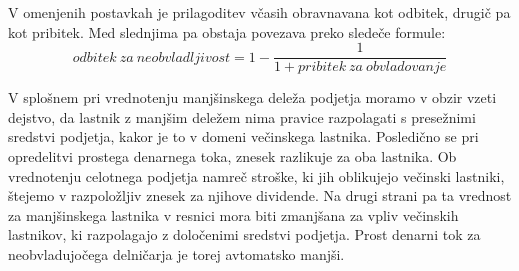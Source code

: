 \documentclass[12pt,a4paper]{amsart}
\theoremstyle{definition} %
\theoremstyle{plain} %
\begin{document}
V omenjenih postavkah je prilagoditev včasih obravnavana kot odbitek, drugič pa kot pribitek. Med slednjima pa obstaja povezava preko sledeče formule:
\begin{equation}
odbitek\ za\ neobvladljivost=1-\frac{1}{1+pribitek\ za\ obvladovanje}
\end{equation}

V splošnem pri vrednotenju manjšinskega deleža podjetja moramo v obzir vzeti dejstvo, da lastnik z manjšim deležem nima pravice razpolagati s presežnimi sredstvi podjetja, kakor je to v domeni večinskega lastnika. Posledično se pri opredelitvi prostega denarnega toka, znesek razlikuje za oba lastnika. Ob vrednotenju celotnega podjetja namreč stroške, ki jih oblikujejo večinski lastniki, štejemo v razpoložljiv znesek za njihove dividende. Na drugi strani pa ta vrednost za manjšinskega lastnika v resnici mora biti zmanjšana za vpliv večinskih lastnikov, ki razpolagajo z določenimi sredstvi podjetja. Prost denarni tok za neobvladujočega delničarja je torej avtomatsko manjši.
\end{document}
